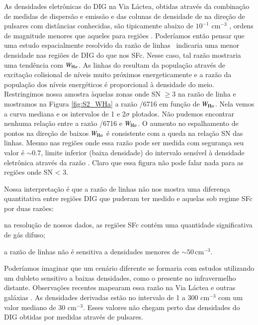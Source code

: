As densidades eletrônicas do DIG na Via Láctea, obtidas através da combinação de medidas de dispersão e emissão e das colunas de densidade de \hi na direção de pulsares com distâncias conhecidas, são tipicamente abaixo de $10^{-1}$ cm$^{-3}$ \citep{Berk.and.Fletcher.2008}, ordens de magnitude menores que aqueles para regiões \hii. Poderíamos então pensar que uma estudo espacialmente resolvido da razão de linhas \Sii\ indicaria uma menor densidade nas regiões de DIG do que nos SFc. Nesse caso, tal razão mostraria uma tendência com $W_{\Ha}$. As linhas do \sii resultam da população através de excitação colisional de níveis muito próximos energeticamente e a razão da população dos níveis energéticos é proporcional à densidade do meio. Restringimos nossa amostra àquelas zonas onde SN $\ge 3$ na razão de linha \sii e mostramos na Figura \ref{fig:S2_WHa} a razão /6716 em função de $W_{\Ha}$. Nela vemos a curva mediana e os intervalos de 1 e 2$\sigma$ plotados. Não pudemos encontrar nenhuma relação entre a razão /6716 e $W_{\Ha}$. O aumento no espalhamento de pontos na direção de baixos $W_{\Ha}$ é consistente com a queda na relação SN das linhas. Mesmo nas regiões onde essa razão pode ser medida com segurança seu valor é $\sim 0.7$, limite inferior (baixa densidade) do intervalo sensível à densidade eletrônica através da razão \sii. Claro que essa figura não pode falar nada para as regiões onde SN < 3.

Nossa interpretação é que a razão de linhas \sii não nos mostra uma diferença quantitativa entre regiões DIG que puderam ter \sii medido e aquelas sob regime SFc por duas razões:
\begin{enumerate*}[label=(\roman*)]
    \item na resolução de nossos dados, as regiões SFc contém uma quantidade significativa de gás difuso;
    \item a razão de linhas \sii não é sensitiva a densidades menores de $\sim 50$\,cm$^{-3}$.
\end{enumerate*}

Poderíamos imaginar que um cenário diferente se formaria com estudos utilizando um dubleto sensitivo a baixas densidades, como o \Nii presente no infravermelho distante. Observações recentes mapearam essa razão na Via Láctea e outras galáxias \citep{Goldsmith.etal.2015, HerreraCamus.etal.2016}. As densidades derivadas estão no intervalo de 1 a 300 cm$^{-3}$ com um valor mediano de 30 cm$^{-3}$. Esses valores não chegam perto das densidades do DIG obtidas por medidas através de pulsares.

